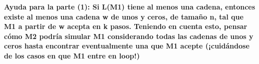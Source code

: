 \documentclass{article}
\begin{document}
\begin{enumerate}
\textbf{Ayuda para la parte (1): Si L(M1) tiene al menos una cadena, entonces existe al menos una
cadena w de unos y ceros, de tamaño n, tal que M1 a partir de w acepta en k pasos. Teniendo
en cuenta esto, pensar cómo M2 podría simular M1 considerando todas las cadenas de unos y
ceros hasta encontrar eventualmente una que M1 acepte (¡cuidándose de los casos en que M1
entre en loop!)}

\end{enumerate}
\end{document}
